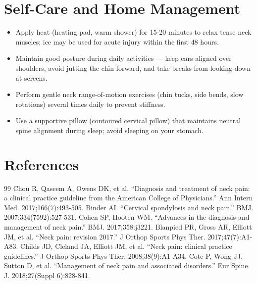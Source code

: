 \section*{Self-Care and Home Management}
\begin{itemize}
  \item Apply heat (heating pad, warm shower) for 15-20 minutes to relax tense neck muscles; ice may be used for acute injury within the first 48 hours.
  \item Maintain good posture during daily activities — keep ears aligned over shoulders, avoid jutting the chin forward, and take breaks from looking down at screens.
  \item Perform gentle neck range-of-motion exercises (chin tucks, side bends, slow rotations) several times daily to prevent stiffness.
  \item Use a supportive pillow (contoured cervical pillow) that maintains neutral spine alignment during sleep; avoid sleeping on your stomach.
\end{itemize}

\section*{References}
\begin{thebibliography}{99}
 Chou R, Qaseem A, Owens DK, et al. ``Diagnosis and treatment of neck pain: a clinical practice guideline from the American College of Physicians.'' Ann Intern Med. 2017;166(7):493-505.
 Binder AI. ``Cervical spondylosis and neck pain.'' BMJ. 2007;334(7592):527-531.
 Cohen SP, Hooten WM. ``Advances in the diagnosis and management of neck pain.'' BMJ. 2017;358:j3221.
 Blanpied PR, Gross AR, Elliott JM, et al. ``Neck pain: revision 2017.'' J Orthop Sports Phys Ther. 2017;47(7):A1-A83.
 Childs JD, Cleland JA, Elliott JM, et al. ``Neck pain: clinical practice guidelines.'' J Orthop Sports Phys Ther. 2008;38(9):A1-A34.
 Cote P, Wong JJ, Sutton D, et al. ``Management of neck pain and associated disorders.'' Eur Spine J. 2018;27(Suppl 6):828-841.
\end{thebibliography}
